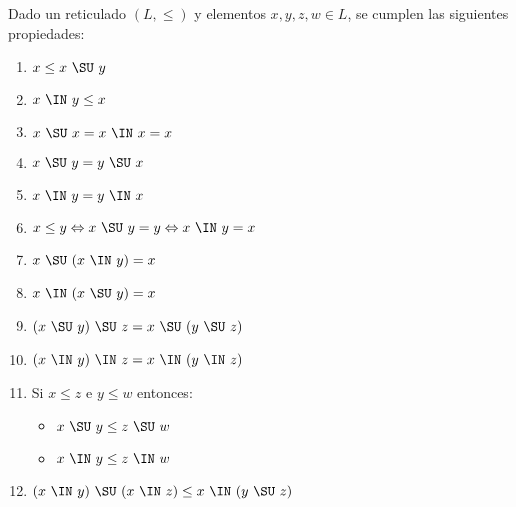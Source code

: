   \begin{lemma}
    \PN Dado un reticulado $(L, \leq)$ y elementos $x, y, z, w \in L$, se cumplen las siguientes propiedades:
    \begin{multicols}{2}
      \begin{enumerate}[(1)]
        \item $x \leq x \ \SU \ y$
        \item $x \ \IN \ y \leq x$
        \item $x \ \SU \ x = x \ \IN \ x = x$
        \item $x \ \SU \ y = y \ \SU \ x$
        \item $x \ \IN \ y = y \ \IN \ x$
        \item $x \leq y \Leftrightarrow x \ \SU \ y = y \Leftrightarrow x \ \IN \ y = x$
        \item $x \ \SU \ (x \ \IN \ y) = x$
        \item $x \ \IN \ (x \ \SU \ y) = x$
        \item $(x \ \SU \ y) \ \SU \ z = x \ \SU \ (y \ \SU \ z)$
        \item $(x \ \IN \ y) \ \IN \ z = x \ \IN \ (y \ \IN \ z)$
        \item Si $x \leq z$ e $y \leq w$ entonces:
          \begin{itemize}
            \item $x \ \SU \ y \leq z \ \SU \ w$
            \item $x \ \IN \ y \leq z \ \IN \ w$
          \end{itemize}
        \item $(x \ \IN \ y) \ \SU \ (x \ \IN \ z) \leq x \ \IN \ (y \ \SU \ z)$
      \end{enumerate}
    \end{multicols}
  \end{lemma}
